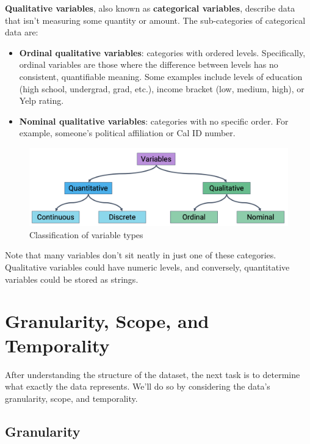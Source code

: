 \documentclass[
  letterpaper,
  DIV=11,
  numbers=noendperiod]{scrreprt}
\providecommand{\tightlist}{%
  \setlength{\itemsep}{0pt}\setlength{\parskip}{0pt}}\usepackage{longtable,booktabs,array}
\begin{document}
\textbf{Qualitative variables}, also known as \textbf{categorical
variables}, describe data that isn't measuring some quantity or amount.
The sub-categories of categorical data are:

\begin{itemize}
\tightlist
\item
  \textbf{Ordinal qualitative variables}: categories with ordered
  levels. Specifically, ordinal variables are those where the difference
  between levels has no consistent, quantifiable meaning. Some examples
  include levels of education (high school, undergrad, grad, etc.),
  income bracket (low, medium, high), or Yelp rating.
\item
  \textbf{Nominal qualitative variables}: categories with no specific
  order. For example, someone's political affiliation or Cal ID number.
\end{itemize}

\begin{figure}[H]

{\centering \includegraphics{eda/images/variable.png}

}

\caption{Classification of variable types}

\end{figure}%

Note that many variables don't sit neatly in just one of these
categories. Qualitative variables could have numeric levels, and
conversely, quantitative variables could be stored as strings.

\section{Granularity, Scope, and
Temporality}\label{granularity-scope-and-temporality}

After understanding the structure of the dataset, the next task is to
determine what exactly the data represents. We'll do so by considering
the data's granularity, scope, and temporality.

\subsection{Granularity}\label{granularity}
\end{document}
